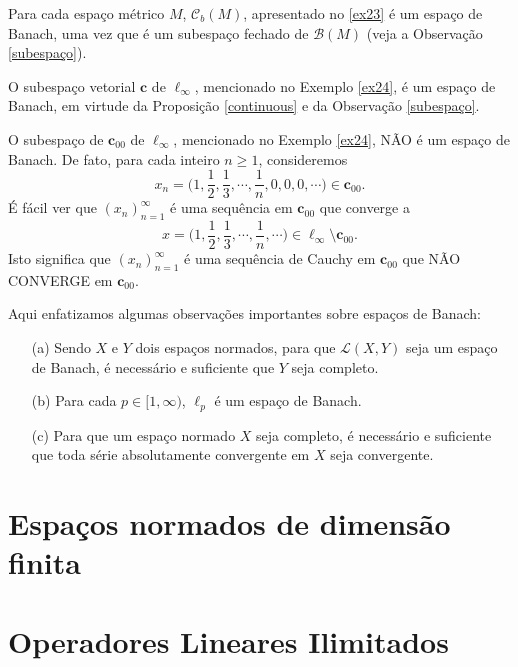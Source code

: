 \begin{example}
    Para cada espaço métrico $M$, $\mathcal C _b (M)$, apresentado no \ref{ex23} é um espaço de Banach, uma vez que é um subespaço fechado de $\mathcal B (M)$ (veja a Observação \ref{subespaço}).
\end{example}

\begin{example}
O subespaço vetorial $\textbf{c}$ de $\ell_{\infty}$, mencionado no Exemplo \ref{ex24}, é um espaço de Banach, em virtude da Proposição \ref{continuous} e da Observação \ref{subespaço}.
\end{example}

\begin{example}
O subespaço de $\textbf{c}_{00}$ de $\ell_{\infty}$, mencionado no Exemplo \ref{ex24}, NÃO é um espaço de Banach. De fato, para cada inteiro $n \geq 1$, consideremos
\[
\displaystyle x_n =\bigg( 1,\frac{1}{2}, \frac{1}{3}, \cdots , \frac{1}{n}, 0, 0, 0,\cdots \bigg) \in \textbf{c}_{00}.
\]
É fácil ver que $(x_n)_{n=1}^{\infty}$ é uma sequência em $\textbf{c} _{00}$ que converge a 
\[
\displaystyle x =\bigg( 1,\frac{1}{2}, \frac{1}{3}, \cdots , \frac{1}{n}, \cdots \bigg) \in \ell_{\infty} \setminus\textbf{c}_{00}.
\]
Isto significa que $(x_n)_{n=1}^{\infty}$ é uma sequência de Cauchy em $\textbf{c}_{00}$ que NÃO CONVERGE em $\textbf{c}_{00}$.
\end{example}

\begin{remark}
    Aqui enfatizamos algumas observações importantes sobre espaços de Banach:
\begin{itemize}
\item[(a)] Sendo $X$ e $Y$ dois espaços normados, para que $\mathcal L (X,Y)$ seja um espaço de Banach, é necessário e suficiente que $Y$ seja completo.
\item[(b)] Para cada $p\in [1,\infty )$, $\ell_p$ é um espaço de Banach.
\item[(c)] Para que um espaço normado $X$ seja completo, é necessário e suficiente que toda série absolutamente convergente em $X$ seja convergente.
\end{itemize}
\end{remark}

\section{Espaços normados de dimensão finita}

\section{Operadores Lineares Ilimitados}

